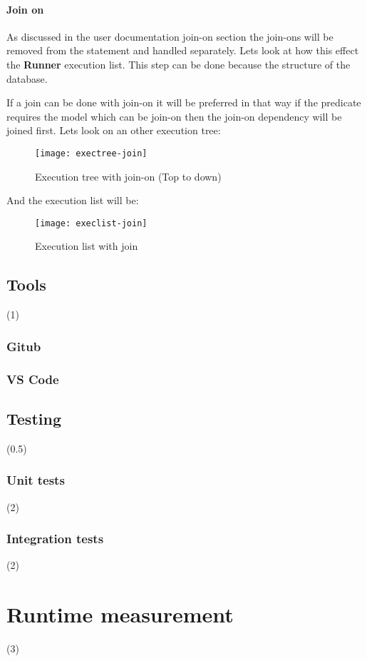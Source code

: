 \newpage
\subsubsection{Join on}
As discussed in the user documentation join-on section the join-ons will be removed from the statement and handled separately. Lets look at how this effect the \textbf{Runner} execution list. This step can be done because the structure of the database.

If a join can be done with join-on it will be preferred in that way if the predicate requires the model which can be join-on then the join-on dependency will be joined first. Lets look on an other execution tree:

 \begin{figure}[H]
	\centering
	\texttt{[image: exectree-join]}
	\caption{Execution tree with join-on (Top to down)}
	\label{fig:fig-help}
\end{figure}

And the execution list will be:

  \begin{figure}[H]
 	\centering
 	\texttt{[image: execlist-join]}
 	\caption{Execution list with join}
 	\label{fig:fig-help}
 \end{figure}

\section{Tools}

(1)

\subsection{Gitub}

\subsection{VS Code}

\section{Testing}

(0.5)

\subsection{Unit tests}

(2)

\subsection{Integration tests}

(2)

\chapter{Runtime measurement}
\label{appx:simulation}

(3)
